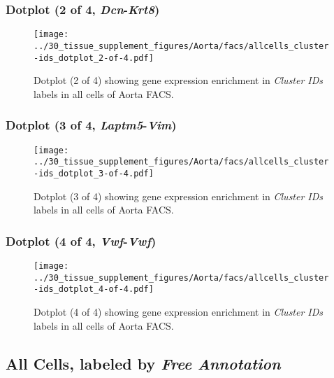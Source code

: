 \clearpage

\subsubsection{Dotplot (2 of 4, \emph{Dcn}-\emph{Krt8})}
\begin{figure}[h]
\centering
\texttt{[image: ../30\_tissue\_supplement\_figures/Aorta/facs/allcells\_cluster-ids\_dotplot\_2-of-4.pdf]}

\caption{ Dotplot (2 of 4)  showing gene expression enrichment in \emph{Cluster IDs} labels in all cells of Aorta FACS. }
\end{figure}


\clearpage

\subsubsection{Dotplot (3 of 4, \emph{Laptm5}-\emph{Vim})}
\begin{figure}[h]
\centering
\texttt{[image: ../30\_tissue\_supplement\_figures/Aorta/facs/allcells\_cluster-ids\_dotplot\_3-of-4.pdf]}

\caption{ Dotplot (3 of 4)  showing gene expression enrichment in \emph{Cluster IDs} labels in all cells of Aorta FACS. }
\end{figure}


\clearpage

\subsubsection{Dotplot (4 of 4, \emph{Vwf}-\emph{Vwf})}
\begin{figure}[h]
\centering
\texttt{[image: ../30\_tissue\_supplement\_figures/Aorta/facs/allcells\_cluster-ids\_dotplot\_4-of-4.pdf]}

\caption{ Dotplot (4 of 4)  showing gene expression enrichment in \emph{Cluster IDs} labels in all cells of Aorta FACS. }
\end{figure}


\clearpage

\subsection{All Cells, labeled by \emph{Free Annotation}}
